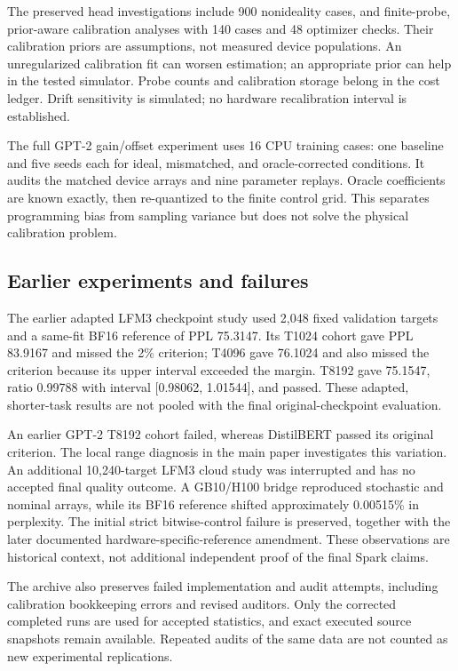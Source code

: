 \documentclass[11pt]{article}
\begin{document}
The preserved head investigations include 900 nonideality cases, and finite-probe, prior-aware calibration analyses with 140 cases and 48 optimizer checks. Their calibration priors are assumptions, not measured device populations. An unregularized calibration fit can worsen estimation; an appropriate prior can help in the tested simulator. Probe counts and calibration storage belong in the cost ledger. Drift sensitivity is simulated; no hardware recalibration interval is established.

The full GPT-2 gain/offset experiment uses 16 CPU training cases: one baseline and five seeds each for ideal, mismatched, and oracle-corrected conditions. It audits the matched device arrays and nine parameter replays. Oracle coefficients are known exactly, then re-quantized to the finite control grid. This separates programming bias from sampling variance but does not solve the physical calibration problem.

\subsection{Earlier experiments and failures}
The earlier adapted LFM3 checkpoint study used 2,048 fixed validation targets and a same-fit BF16 reference of PPL 75.3147. Its T1024 cohort gave PPL 83.9167 and missed the 2\% criterion; T4096 gave 76.1024 and also missed the criterion because its upper interval exceeded the margin. T8192 gave 75.1547, ratio 0.99788 with interval [0.98062, 1.01544], and passed. These adapted, shorter-task results are not pooled with the final original-checkpoint evaluation.

An earlier GPT-2 T8192 cohort failed, whereas DistilBERT passed its original criterion. The local range diagnosis in the main paper investigates this variation. An additional 10,240-target LFM3 cloud study was interrupted and has no accepted final quality outcome. A GB10/H100 bridge reproduced stochastic and nominal arrays, while its BF16 reference shifted approximately 0.00515\% in perplexity. The initial strict bitwise-control failure is preserved, together with the later documented hardware-specific-reference amendment. These observations are historical context, not additional independent proof of the final Spark claims.

The archive also preserves failed implementation and audit attempts, including calibration bookkeeping errors and revised auditors. Only the corrected completed runs are used for accepted statistics, and exact executed source snapshots remain available. Repeated audits of the same data are not counted as new experimental replications.
\end{document}
